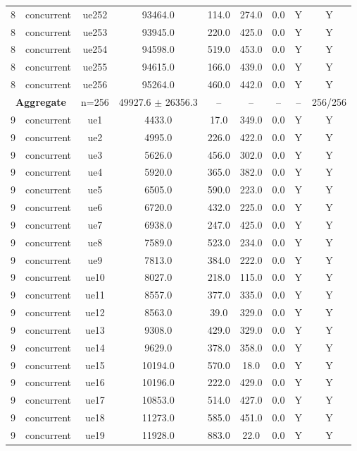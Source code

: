 \begin{table}[ht]
\begin{tabular}{|c|c|c|c|c|c|c|c|c|}
8 & concurrent & ue252 & 93464.0 & 114.0 & 274.0 & 0.0 & Y & Y \\
8 & concurrent & ue253 & 93945.0 & 220.0 & 425.0 & 0.0 & Y & Y \\
8 & concurrent & ue254 & 94598.0 & 519.0 & 453.0 & 0.0 & Y & Y \\
8 & concurrent & ue255 & 94615.0 & 166.0 & 439.0 & 0.0 & Y & Y \\
8 & concurrent & ue256 & 95264.0 & 460.0 & 442.0 & 0.0 & Y & Y \\
\multicolumn{2}{|c|}{\textbf{Aggregate}} & n=256 & 49927.6 $\pm$ 26356.3 & -- & -- & -- & -- & 256/256 \\
\hline
9 & concurrent & ue1 & 4433.0 & 17.0 & 349.0 & 0.0 & Y & Y \\
9 & concurrent & ue2 & 4995.0 & 226.0 & 422.0 & 0.0 & Y & Y \\
9 & concurrent & ue3 & 5626.0 & 456.0 & 302.0 & 0.0 & Y & Y \\
9 & concurrent & ue4 & 5920.0 & 365.0 & 382.0 & 0.0 & Y & Y \\
9 & concurrent & ue5 & 6505.0 & 590.0 & 223.0 & 0.0 & Y & Y \\
9 & concurrent & ue6 & 6720.0 & 432.0 & 225.0 & 0.0 & Y & Y \\
9 & concurrent & ue7 & 6938.0 & 247.0 & 425.0 & 0.0 & Y & Y \\
9 & concurrent & ue8 & 7589.0 & 523.0 & 234.0 & 0.0 & Y & Y \\
9 & concurrent & ue9 & 7813.0 & 384.0 & 222.0 & 0.0 & Y & Y \\
9 & concurrent & ue10 & 8027.0 & 218.0 & 115.0 & 0.0 & Y & Y \\
9 & concurrent & ue11 & 8557.0 & 377.0 & 335.0 & 0.0 & Y & Y \\
9 & concurrent & ue12 & 8563.0 & 39.0 & 329.0 & 0.0 & Y & Y \\
9 & concurrent & ue13 & 9308.0 & 429.0 & 329.0 & 0.0 & Y & Y \\
9 & concurrent & ue14 & 9629.0 & 378.0 & 358.0 & 0.0 & Y & Y \\
9 & concurrent & ue15 & 10194.0 & 570.0 & 18.0 & 0.0 & Y & Y \\
9 & concurrent & ue16 & 10196.0 & 222.0 & 429.0 & 0.0 & Y & Y \\
9 & concurrent & ue17 & 10853.0 & 514.0 & 427.0 & 0.0 & Y & Y \\
9 & concurrent & ue18 & 11273.0 & 585.0 & 451.0 & 0.0 & Y & Y \\
9 & concurrent & ue19 & 11928.0 & 883.0 & 22.0 & 0.0 & Y & Y \\

\end{tabular}
\end{table}
